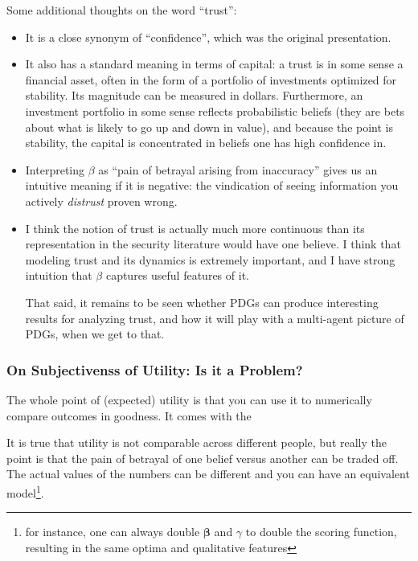 \documentclass[twoside]{article} %
\theoremstyle{plain}
\theoremstyle{definition}
\newcommand{\bbeta}{\boldsymbol\beta}
\begin{document}
    Some additional thoughts on the word ``trust'':
    \begin{itemize}
        \item It is a close synonym of ``confidence'', which was the original presentation.

        \item It also has a standard meaning in terms of capital: a trust is in some sense a financial asset, often in the form of a portfolio of investments optimized for stability. Its magnitude can be measured in dollars.
        Furthermore, an investment portfolio in some sense reflects probabilistic beliefs (they are bets about what is likely to go up and down in value), and because the point is stability, the capital is concentrated in beliefs one has high confidence in.

        \item Interpreting $\beta$ as ``pain of betrayal arising from inaccuracy'' gives us an intuitive meaning if it is negative: the vindication of seeing information you actively \emph{distrust} proven wrong.
        \item I think the notion of trust is actually much more continuous than its representation in the security literature would have one believe. I think that modeling trust and its dynamics is extremely important, and I have strong intuition that $\beta$ captures useful features of it.

        That said, it remains to be seen whether PDGs can produce interesting results for analyzing trust, and how it will play with a multi-agent picture of PDGs, when we get to that.
    \end{itemize}



    \subsubsection{On Subjectivenss of Utility: Is it a Problem?}
    \label{disutility:subjective}

    The whole point of (expected) utility is that you can use it to numerically compare outcomes in goodness. It comes with the

    It is true that utility is not comparable across different people, but really the point is that the pain of betrayal of one belief versus another can be traded off.
    The actual values of the numbers can be different and you can have an equivalent model\footnote{for instance, one can always double $\bbeta$ and $\gamma$ to double the scoring function, resulting in the same optima and qualitative features}.
\end{document}
